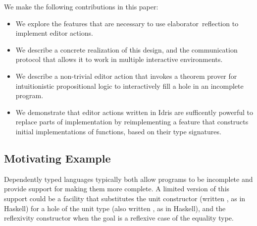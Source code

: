 
We make the following contributions in this paper:

\begin{itemize}[topsep=0pt] %
\item We explore the features that are necessary to use
  \mbox{elaborator reflection} to implement editor actions.
\item We describe a concrete realization of this design, and the
  communication protocol that allows it to work in multiple
  interactive environments.
\item We describe a non-trivial editor action that invokes a
  theorem prover for intuitionistic propositional logic to
  interactively fill a hole in an incomplete
  program.
\item We demonstrate that editor actions written in Idris are
  sufficently powerful to replace parts of implementation by
  reimplementing a feature that constructs initial implementations of
  functions, based on their type signatures.
\end{itemize}


\subsection{Motivating Example}

Dependently typed languages typically both allow programs to be
incomplete and provide support for making them more complete. A
limited version of this support could be a facility that substitutes
the unit constructor (written \dt{()}, as in Haskell) for a hole of
the unit type (also written \ty{()}, as in Haskell), and the
reflexivity constructor  when the goal is a reflexive case of
the equality type.

